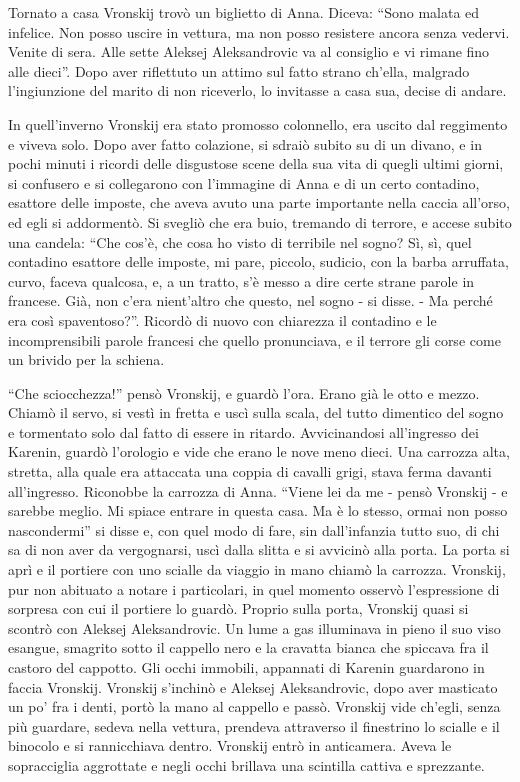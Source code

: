 \label{ii-3} 

Tornato a casa Vronskij trovò un biglietto di Anna. Diceva: ``Sono malata ed infelice. Non posso uscire in vettura, ma non posso resistere ancora senza vedervi. Venite di sera. Alle sette Aleksej Aleksandrovic va al consiglio e vi rimane fino alle dieci''. Dopo aver riflettuto un attimo sul fatto strano ch'ella, malgrado l'ingiunzione del marito di non riceverlo, lo invitasse a casa sua, decise di andare. 

In quell'inverno Vronskij era stato promosso colonnello, era uscito dal reggimento e viveva solo. Dopo aver fatto colazione, si sdraiò subito su di un divano, e in pochi minuti i ricordi delle disgustose scene della sua vita di quegli ultimi giorni, si confusero e si collegarono con l'immagine di Anna e di un certo contadino, esattore delle imposte, che aveva avuto una parte importante nella caccia all'orso, ed egli si addormentò. Si svegliò che era buio, tremando di terrore, e accese subito una candela: ``Che cos'è, che cosa ho visto di terribile nel sogno? Sì, sì, quel contadino esattore delle imposte, mi pare, piccolo, sudicio, con la barba arruffata, curvo, faceva qualcosa, e, a un tratto, s'è messo a dire certe strane parole in francese. Già, non c'era nient'altro che questo, nel sogno - si disse. - Ma perché era così spaventoso?''. Ricordò di nuovo con chiarezza il contadino e le incomprensibili parole francesi che quello pronunciava, e il terrore gli corse come un brivido per la schiena. 

``Che sciocchezza!'' pensò Vronskij, e guardò l'ora. Erano già le otto e mezzo. Chiamò il servo, si vestì in fretta e uscì sulla scala, del tutto dimentico del sogno e tormentato solo dal fatto di essere in ritardo. Avvicinandosi all'ingresso dei Karenin, guardò l'orologio e vide che erano le nove meno dieci. Una carrozza alta, stretta, alla quale era attaccata una coppia di cavalli grigi, stava ferma davanti all'ingresso. Riconobbe la carrozza di Anna. ``Viene lei da me - pensò Vronskij - e sarebbe meglio. Mi spiace entrare in questa casa. Ma è lo stesso, ormai non posso nascondermi'' si disse e, con quel modo di fare, sin dall'infanzia tutto suo, di chi sa di non aver da vergognarsi, uscì dalla slitta e si avvicinò alla porta. La porta si aprì e il portiere con uno scialle da viaggio in mano chiamò la carrozza. Vronskij, pur non abituato a notare i particolari, in quel momento osservò l'espressione di sorpresa con cui il portiere lo guardò. Proprio sulla porta, Vronskij quasi si scontrò con Aleksej Aleksandrovic. Un lume a gas illuminava in pieno il suo viso esangue, smagrito sotto il cappello nero e la cravatta bianca che spiccava fra il castoro del cappotto. Gli occhi immobili, appannati di Karenin guardarono in faccia Vronskij. Vronskij s'inchinò e Aleksej Aleksandrovic, dopo aver masticato un po' fra i denti, portò la mano al cappello e passò. Vronskij vide ch'egli, senza più guardare, sedeva nella vettura, prendeva attraverso il finestrino lo scialle e il binocolo e si rannicchiava dentro. Vronskij entrò in anticamera. Aveva le sopracciglia aggrottate e negli occhi brillava una scintilla cattiva e sprezzante. 

